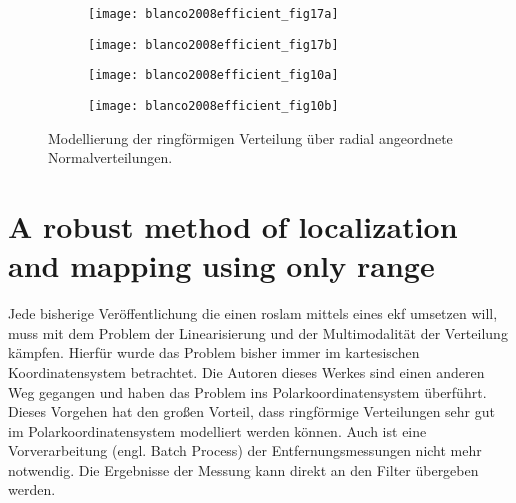\begin{figure}[!ht]
	\begin{subfigure}[t]{0.24\linewidth}
		\texttt{[image: blanco2008efficient\_fig17a]}
		\caption{}
		\label{fig:blanco2008efficient_fig17a}
	\end{subfigure}
	\hfill
	\begin{subfigure}[t]{0.24\linewidth}
		\texttt{[image: blanco2008efficient\_fig17b]}
		\caption{}
		\label{fig:blanco2008efficient_fig17b}
	\end{subfigure}
	\hfill
	\begin{subfigure}[t]{0.24\linewidth}
		\texttt{[image: blanco2008efficient\_fig10a]}
		\caption{}
		\label{fig:blanco2008efficient_fig10a}
	\end{subfigure}
	\hfill
	\begin{subfigure}[t]{0.24\linewidth}
		\texttt{[image: blanco2008efficient\_fig10b]}
		\caption{}
		\label{fig:blanco2008efficient_fig10b}
	\end{subfigure}
	\caption{Modellierung der ringförmigen Verteilung über radial angeordnete Normalverteilungen.}
	\label{fig:blanco2008efficient}
\end{figure}


\begin{comment}
--------------------------------------------------------------------------------
- \cite{djugash2009robust}
	- A robust method of localization and mapping using only range
\end{comment}
\section{A robust method of localization and mapping using only range}

Jede bisherige Veröffentlichung die einen \Gls{roslam} mittels eines \Gls{ekf} umsetzen will, muss mit dem Problem der Linearisierung und der Multimodalität der Verteilung kämpfen. Hierfür wurde das Problem bisher immer im kartesischen Koordinatensystem betrachtet. Die Autoren dieses Werkes \cite{djugash2009robust} sind einen anderen Weg gegangen und haben das Problem ins Polarkoordinatensystem überführt. Dieses Vorgehen hat den großen Vorteil, dass ringförmige Verteilungen sehr gut im Polarkoordinatensystem modelliert werden können. Auch ist eine Vorverarbeitung (engl. Batch Process) der Entfernungsmessungen nicht mehr notwendig. Die Ergebnisse der Messung kann direkt an den Filter übergeben werden.

